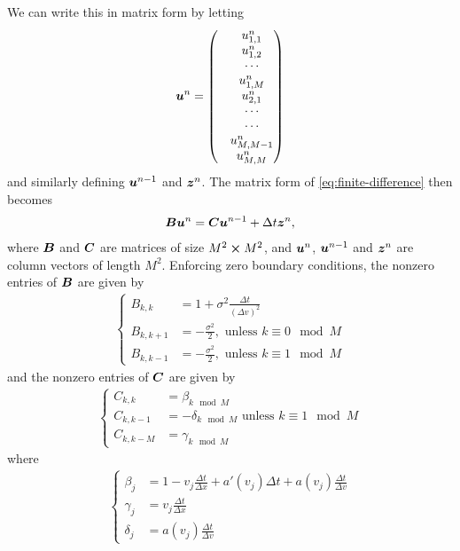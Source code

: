 \documentclass{article}  %
\begin{document}
We can write this in matrix form by letting 
%
\begin{align} 
    \boldsymbol{u}^n = 
    \begin{pmatrix}
        &u^n_{1,1}\\
        & u^n_{1,2}\\
        & \cdots \\
        &u^n_{1,M}\\
        &u^n_{2,1}\\
        & \cdots \\ 
        & \cdots \\ 
        &u^n_{M,M-1}\\
        &u^n_{M,M} 
    \end{pmatrix}
\end{align}
%
and similarly defining $\boldsymbol{u}^{n-1}$ and $\boldsymbol{z}^n$. The matrix form of \autoref{eq:finite-difference} then becomes 
%
\begin{align} 
    \label{eq:fd-matrix}
    \boldsymbol{B} \boldsymbol{u}^n = \boldsymbol{C} \boldsymbol{u}^{n-1} + \Delta t \boldsymbol{z}^n,
\end{align}
%
where $\boldsymbol{B}$ and $\boldsymbol{C}$ are matrices of size $M^2 \cross M^2$, and $\boldsymbol{u}^n$, $\boldsymbol{u}^{n-1}$ and $\boldsymbol{z}^n$ are column vectors of length $M^2$. Enforcing zero boundary conditions, the nonzero entries of $\boldsymbol{B}$ are given by
%
\begin{align} 
    \begin{cases} 
        B_{k,k} &= 1 + \sigma^2 \frac{\Delta t}{(\Delta v)^2}\\
        B_{k,k+1} &= - \frac{\sigma^2}{2},\text{ unless } k \equiv 0 \mod M\\ 
        B_{k,k-1} &= - \frac{\sigma^2}{2},\text{ unless } k \equiv 1 \mod M
    \end{cases}
\end{align}
%
and the nonzero entries of $\boldsymbol{C}$ are given by 
%
\begin{align} 
    \begin{cases}
        C_{k,k} &= \beta_{k \mod M}\\
        C_{k,k-1} &= - \delta_{k \mod M}\text{ unless } k \equiv 1 \mod M\\
        C_{k,k-M} &= \gamma_{k \mod M}
    \end{cases}
\end{align}
%
where 
%
\begin{align} 
    \begin{cases} 
        \beta_j &= 1 - v_j \frac{\Delta t}{\Delta x} + a'(v_j)\Delta t + a(v_j)\frac{\Delta t}{\Delta v}\\
        \gamma_j &= v_j \frac{\Delta t}{\Delta x} \\
        \delta_j &= a(v_j)\frac{\Delta t}{\Delta v}
    \end{cases}
\end{align}
%
\end{document}
